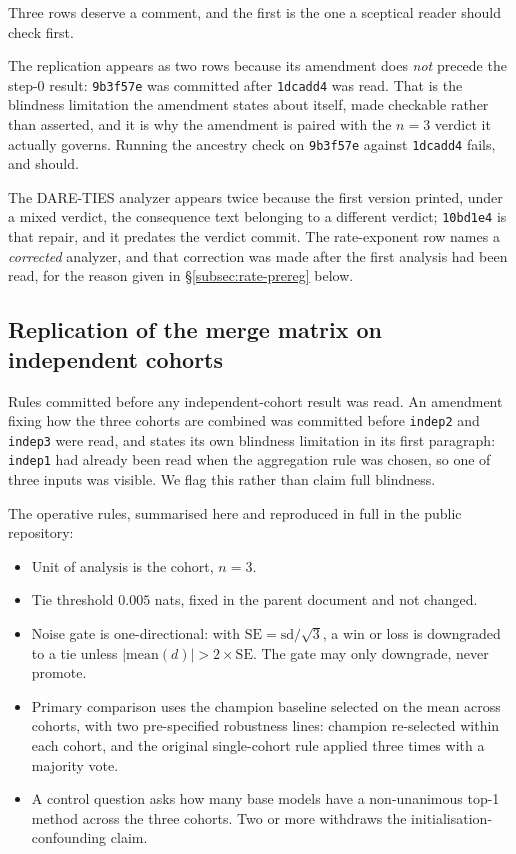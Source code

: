 Three rows deserve a comment, and the first is the one a sceptical reader
should check first.

The replication appears as two rows because its amendment does \emph{not}
precede the step-0 result: \texttt{9b3f57e} was committed after
\texttt{1dcadd4} was read. That is the blindness limitation the amendment
states about itself, made checkable rather than asserted, and it is why the
amendment is paired with the $n=3$ verdict it actually governs. Running the
ancestry check on \texttt{9b3f57e} against \texttt{1dcadd4} fails, and should.

The DARE-TIES analyzer appears twice because the first version printed, under a
mixed verdict, the consequence text belonging to a different verdict;
\texttt{10bd1e4} is that repair, and it predates the verdict commit. The
rate-exponent row names a \emph{corrected} analyzer, and that correction was
made after the first analysis had been read, for the reason given in
\S\ref{subsec:rate-prereg} below.

\subsection{Replication of the merge matrix on independent cohorts}

Rules committed before any independent-cohort result was read. An
amendment fixing how the three cohorts are combined was committed before
\texttt{indep2} and \texttt{indep3} were read, and states its own
blindness limitation in its first paragraph: \texttt{indep1} had already
been read when the aggregation rule was chosen, so one of three inputs
was visible. We flag this rather than claim full blindness.

The operative rules, summarised here and reproduced in full in the
public repository:
\begin{itemize}
\item Unit of analysis is the cohort, $n = 3$.
\item Tie threshold $0.005$ nats, fixed in the parent document and not
  changed.
\item Noise gate is one-directional: with
  $\mathrm{SE} = \mathrm{sd}/\sqrt{3}$, a win or loss is downgraded to a
  tie unless $|\mathrm{mean}(d)| > 2\times\mathrm{SE}$. The gate may only
  downgrade, never promote.
\item Primary comparison uses the champion baseline selected on the mean
  across cohorts, with two pre-specified robustness lines: champion
  re-selected within each cohort, and the original single-cohort rule
  applied three times with a majority vote.
\item A control question asks how many base models have a non-unanimous
  top-1 method across the three cohorts. Two or more withdraws the
  initialisation-confounding claim.
\end{itemize}

